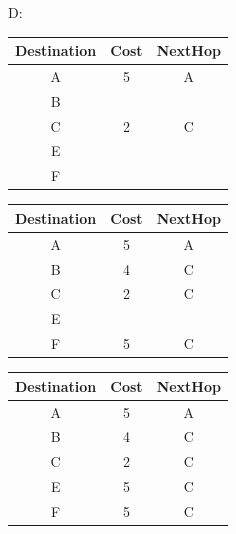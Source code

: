 \documentclass[12pt]{article}
\begin{document}
D:\\
\begin{tabular}{|c|c|c|}
	\hline
	Destination & Cost & NextHop \\\hline
	\hline
	A           & 5    & A       \\\hline
	B           &      &         \\\hline
	C           & 2    & C       \\\hline
	E           &      &         \\\hline
	F           &      &         \\\hline
\end{tabular}
\begin{tabular}{|c|c|c|}
	\hline
	Destination & Cost & NextHop \\\hline
	\hline
	A           & 5    & A       \\\hline
	B           & 4    & C       \\\hline
	C           & 2    & C       \\\hline
	E           &      &         \\\hline
	F           & 5    & C       \\\hline
\end{tabular}
\begin{tabular}{|c|c|c|}
	\hline
	Destination & Cost & NextHop \\\hline
	\hline
	A           & 5    & A       \\\hline
	B           & 4    & C       \\\hline
	C           & 2    & C       \\\hline
	E           & 5    & C       \\\hline
	F           & 5    & C       \\\hline
\end{tabular}\\[3mm]
\end{document}
